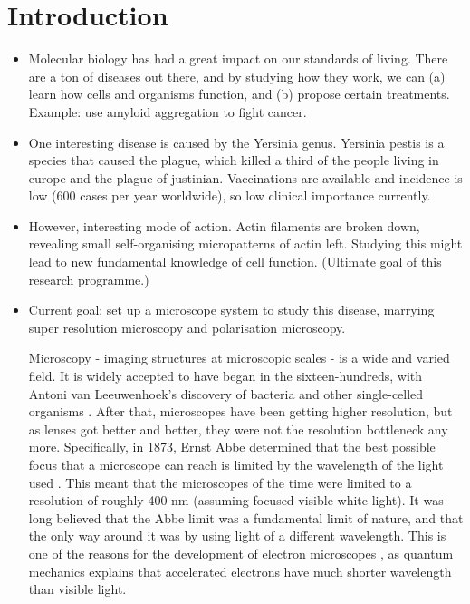 \chapter{Introduction}

\begin{itemize}
	\item Molecular biology has had a great impact on our standards of living. There are a ton of diseases out there, and by studying how they work, we can (a) learn how cells and organisms function, and (b) propose certain treatments. Example: use amyloid aggregation to fight cancer.
	
	\item One interesting disease is caused by the Yersinia genus. Yersinia pestis is a species that caused the plague, which killed a third of the people living in europe and the plague of justinian. Vaccinations are available and incidence is low (600 cases per year worldwide), so low clinical importance currently.
	
	\item However, interesting mode of action. Actin filaments are broken down, revealing small self-organising micropatterns of actin left. Studying this might lead to new fundamental knowledge of cell function. (Ultimate goal of this research programme.)
	
	\item Current goal: set up a microscope system to study this disease, marrying super resolution microscopy and polarisation microscopy.
	
	Microscopy - imaging structures at microscopic scales - is a wide and varied field. It is widely accepted to have began in the sixteen-hundreds, with Antoni van Leeuwenhoek's discovery of bacteria and other single-celled organisms \cite{VanZuylen1981}. After that, microscopes have been getting higher resolution, but as lenses got better and better, they were not the resolution bottleneck any more. Specifically, in 1873, Ernst Abbe determined that the best possible focus that a microscope can reach is limited by the wavelength of the light used \cite{Abbe1873}. This meant that the microscopes of the time were limited to a resolution of roughly 400 nm (assuming focused visible white light). It was long believed that the Abbe limit was a fundamental limit of nature, and that the only way around it was by using light of a different wavelength. This is one of the reasons for the development of electron microscopes \cite{Smith2008}, as quantum mechanics explains that accelerated electrons have much shorter wavelength than visible light. 
	

\end{itemize}
